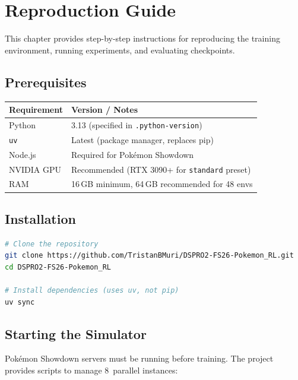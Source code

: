 \chapter{Reproduction Guide}
\label{ch:reproduction}

This chapter provides step-by-step instructions for reproducing the training
environment, running experiments, and evaluating checkpoints.

\section{Prerequisites}

\begin{center}
\small
\begin{tabularx}{0.7\textwidth}{l l}
  \toprule
  \textbf{Requirement} & \textbf{Version / Notes} \\
  \midrule
  Python      & 3.13 (specified in \texttt{.python-version}) \\
  \texttt{uv} & Latest (package manager, replaces pip) \\
  Node.js     & Required for Pok\'{e}mon Showdown \\
  NVIDIA GPU  & Recommended (RTX 3090+ for \texttt{standard} preset) \\
  RAM         & 16\,GB minimum, 64\,GB recommended for 48 envs \\
  \bottomrule
\end{tabularx}
\end{center}

\section{Installation}

\begin{lstlisting}[language=bash]
# Clone the repository
git clone https://github.com/TristanBMuri/DSPRO2-FS26-Pokemon_RL.git
cd DSPRO2-FS26-Pokemon_RL

# Install dependencies (uses uv, not pip)
uv sync
\end{lstlisting}

\section{Starting the Simulator}

Pok\'{e}mon Showdown servers must be running before training.  The project
provides scripts to manage 8~parallel instances:

